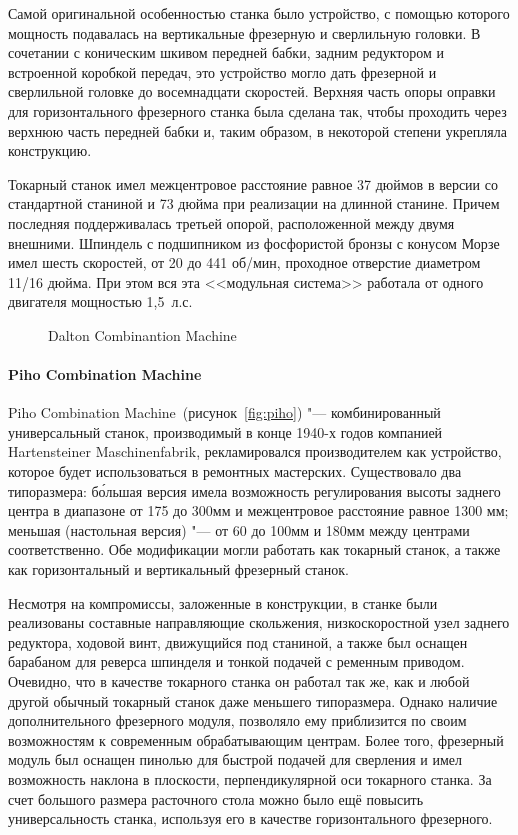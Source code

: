 Самой оригинальной особенностью станка было устройство, с помощью которого мощность подавалась на вертикальные фрезерную и сверлильную головки. В сочетании с коническим шкивом передней бабки, задним редуктором и встроенной коробкой передач, это устройство могло дать фрезерной и сверлильной головке до восемнадцати скоростей. Верхняя часть опоры оправки для горизонтального фрезерного станка была сделана так, чтобы проходить через верхнюю часть передней бабки и, таким образом, в некоторой степени укрепляла конструкцию.

Токарный станок имел межцентровое расстояние равное 37 дюймов в версии со стандартной станиной и 73 дюйма при реализации на длинной станине. Причем последняя поддерживалась третьей опорой, расположенной между двумя внешними. Шпиндель с подшипником из фосфористой бронзы с конусом Морзе имел шесть скоростей, от 20 до 441 об/мин, проходное отверстие диаметром 11/16 дюйма. При этом вся эта <<модульная система>> работала от одного двигателя мощностью 1,5~л.\:с.

\begin{figure}[ht]
	\caption{Dalton Combinantion Machine}\label{fig:dalton}
\end{figure}

\paragraph{Piho Combination Machine}

Piho Combination Machine~(рисунок~\cref{fig:piho}) "--- комбинированный универсальный станок, производимый в конце 1940-х годов компанией Hartensteiner Maschinenfabrik, рекламировался производителем как устройство, которое будет использоваться в ремонтных мастерских. Существовало два типоразмера: б\'ольшая версия имела возможность регулирования высоты заднего центра в диапазоне от 175 до 300\:мм и межцентровое расстояние равное 1300 мм; меньшая (настольная версия) "--- от 60 до 100\:мм и 180\:мм между центрами соответственно. Обе модификации могли работать как токарный станок, а также как горизонтальный и вертикальный фрезерный станок.

Несмотря на компромиссы, заложенные в конструкции, в станке были реализованы составные направляющие скольжения, низкоскоростной узел заднего редуктора, ходовой винт, движущийся под станиной, а также был оснащен барабаном для реверса шпинделя и тонкой подачей с ременным приводом. Очевидно, что в качестве токарного станка он работал так же, как и любой другой обычный токарный станок даже меньшего типоразмера. Однако наличие дополнительного фрезерного модуля, позволяло ему приблизится по своим возможностям к современным обрабатывающим центрам. Более того, фрезерный модуль был оснащен пинолью для быстрой подачей для сверления и имел возможность наклона в плоскости, перпендикулярной оси токарного станка. За счет большого размера расточного стола можно было ещё повысить универсальность станка, используя его в качестве горизонтального фрезерного.


